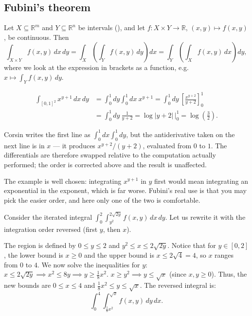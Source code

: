 \subsection{Fubini's theorem}
\label{sec:fubini}

\begin{theorem}[Fubini]
\label{thm:fubini}
Let $X \subseteq \mathbb{R}^m$ and $Y \subseteq \mathbb{R}^n$ be intervals (), and let
$f : X\times Y \to \mathbb{R}$, $(x,y)\mapsto f(x,y)$, be continuous. Then
\[\int_{X\times Y} f(x,y)\,dx\,dy
  = \int_X\left(\int_Y f(x,y)\,dy\right)dx
  = \int_Y\left(\int_X f(x,y)\,dx\right)dy,\]
where we look at the expression in brackets as a function, e.g.\
$x \mapsto \int_Y f(x,y)\,dy$.
\end{theorem}

\begin{example}
\label{ex:fubini_unit_square}
\[
\begin{aligned}
\int_{[0,1]^2} x^{y+1}\,dx\,dy
  &= \int_0^1 dy \int_0^1 dx\ x^{y+1}
   = \int_0^1 dy\ \left[\frac{x^{y+2}}{y+2}\right]_0^1 \\
  &= \int_0^1 dy\ \frac{1}{y+2}
   = \log|y+2|\,\Big|_0^1
   = \log\!\left(\tfrac32\right).
\end{aligned}
\]
\end{example}

\begin{ainote}
Corsin writes the first line as $\int_0^1 dx \int_0^1 dy$, but the antiderivative taken on the
next line is in $x$ --- it produces $x^{y+2}/(y+2)$, evaluated from $0$ to $1$. The differentials
are therefore swapped relative to the computation actually performed; the order is corrected
above and the result is unaffected.

The example is well chosen: integrating $x^{y+1}$ in $y$ first would mean integrating an
exponential in the exponent, which is far worse. Fubini's real use is that you may pick the
easier order, and here only one of the two is comfortable.
\end{ainote}

\begin{example}
\label{ex:change_order_integration}
Consider the iterated integral $\int_0^2 \int_{y^2}^{2\sqrt{2y}} f(x,y) \,dx\,dy$. Let us rewrite it with the integration order reversed (first $y$, then $x$).

The region is defined by $0 \leq y \leq 2$ and $y^2 \leq x \leq 2\sqrt{2y}$.
Notice that for $y \in [0,2]$, the lower bound is $x \geq 0$ and the upper bound is $x \leq 2\sqrt{4} = 4$, so $x$ ranges from $0$ to $4$.
We now solve the inequalities for $y$:
$x \leq 2\sqrt{2y} \implies x^2 \leq 8y \implies y \geq \frac{1}{8}x^2$.
$x \geq y^2 \implies y \leq \sqrt{x}$ (since $x,y \geq 0$).
Thus, the new bounds are $0 \leq x \leq 4$ and $\frac{1}{8}x^2 \leq y \leq \sqrt{x}$. The reversed integral is:
\[\int_0^4 \int_{\frac{1}{8}x^2}^{\sqrt{x}} f(x,y) \,dy\,dx.\]
\end{example}

